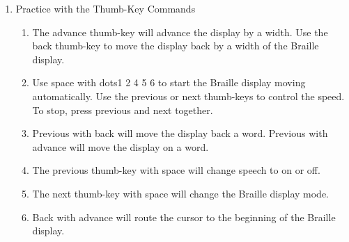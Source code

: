 \documentclass[10pt,letterpaper,twoside]{report}
\begin{document}
{{{\begin{enumerate}
\begin{enumerate}
		      \item To find a text string, press space with f.
		      \item To move back a character and forward by character, use space with dot3 or space with dot6. Space with dots3 and 6 will read the current character.
		      \item To hear the current word, press space with dots2 5.  Space with dot2 or space with dot5 will move back or forward by word.
		      \item To read back and forward by sentence, use space with dot4 or space with dot1.
		      \item Space with dots2 3 will move back by paragraph.  Space with dots5 6 will move forward by paragraph.  Space with dots2 3 5 6 will read the current paragraph.
		      \item Space with m will determine the current reading mode.
		      \item Space with m repeated will change the current reading mode.
		      \item Enter with dots5 6 will move to the next text section.  Enter with dots2 3 will move to the previous text section.
		      \item Space with w will announce the key name.
		      \item To query the current cursor position, use space with dots1 5 6.
	      \end{enumerate}
	\item Practice with the Thumb-Key Commands
	      \begin{enumerate}
		      \item The advance thumb-key will advance the display by a width.  Use the back thumb-key to move the display back by a width of the Braille display.
		      \item Use space with dots1 2 4 5 6 to start the Braille display moving automatically.  Use the previous or next thumb-keys to control the speed.  To stop, press previous and next together.
		      \item Previous with back will move the display back a word.  Previous with advance will move the display on a word.
		      \item The previous thumb-key with space will change speech to on or off.
		      \item The next thumb-key with space will change the Braille display mode.
		      \item Back with advance will route the cursor to the beginning of the Braille display.

\end{enumerate}
\end{enumerate}}}}
\end{document}
